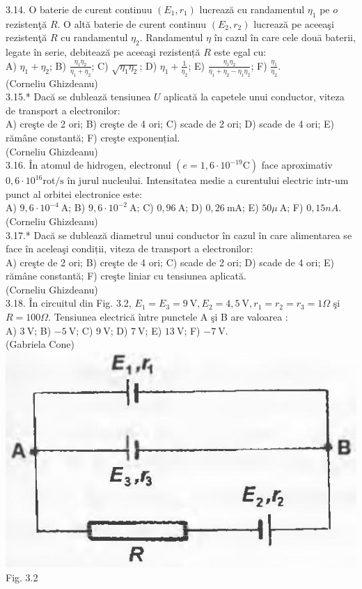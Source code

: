 3.14. O baterie de curent continuu $\left(E_{1}, r_{1}\right)$ lucrează cu randamentul $\eta_{1}$ pe $o$ rezistenţă $R$. O altă baterie de curent continuu $\left(E_{2}, r_{2}\right)$ lucrează pe aceeaşi rezistenţă $R$ cu randamentul $\eta_{2}$. Randamentul $\eta$ în cazul în care cele douā baterii, legate în serie, debitează pe aceeaşi rezistență $R$ este egal cu:\\ A) $\eta_{1}+\eta_{2}$; B) $\frac{\eta_{1} \eta_{2}}{\eta_{1}+\eta_{2}}$; C) $\sqrt{\eta_{1} \eta_{2}}$; D) $\eta_{1}+\frac{1}{\eta_{2}}$; E) $\frac{\eta_{1} \eta_{2}}{\eta_{1}+\eta_{2}-\eta_{1} \eta_{2}}$; F) $\frac{\eta_{1}}{\eta_{2}}$.\\ (Corneliu Ghizdeanu)\\

3.15.* Dacă se dublează tensiunea $U$ aplicată la capetele unui conductor, viteza de transport a electronilor:\\ A) creşte de 2 ori; B) creşte de 4 ori; C) scade de 2 ori; D) scade de 4 ori; E) rămâne constantă; F) creşte exponențial.\\ (Corneliu Ghizdeanu)\\

3.16. În atomul de hidrogen, electronul $\left(e=1,6 \cdot 10^{-19} \mathrm{C}\right)$ face aproximativ $0,6 \cdot 10^{16} \mathrm{rot} / \mathrm{s}$ în jurul nucleului. Intensitatea medie a curentului electric intr-um punct al orbitei electronice este:\\ A) $9,6 \cdot 10^{-4} \mathrm{~A}$; B) $9,6 \cdot 10^{-2} \mathrm{~A}$; C) $0,96 \mathrm{~A}$; D) $0,26 \mathrm{~mA}$; E) $50 \mu \mathrm{~A}$; F) $0,15 n A$.\\ (Corneliu Ghizdeanu)\\

3.17.* Dacă se dublează diametrul unui conductor în cazul în care alimentarea se face în aceleaşi condiții, viteza de transport a electronilor:\\ A) creşte de 2 ori; B) creşte de 4 ori; C) scade de 2 ori; D) scade de 4 ori; E) rămâne constantă; F) creşte liniar cu tensiunea aplicată.\\ (Corneliu Ghizdeanu)\\

3.18. În circuitul din Fig. 3.2, $E_{1}=E_{3}=9 \mathrm{~V}, E_{2}=4,5 \mathrm{~V}, r_{1}=r_{2}=r_{3}=1 \Omega$ şi $R=100 \Omega$. Tensiunea electrică între punctele A şi B are valoarea :\\ A) $3 \mathrm{~V}$; B) $-5 \mathrm{~V}$; C) $9 \mathrm{~V}$; D) $7 \mathrm{~V}$; E) $13 \mathrm{~V}$; F) $-7 \mathrm{~V}$.\\ (Gabriela Cone)\\ \includegraphics[width=0.4\linewidth]{images/2025_07_01_5b3ff9fa0d508c8e9f17g-147(1)} Fig. 3.2\\

